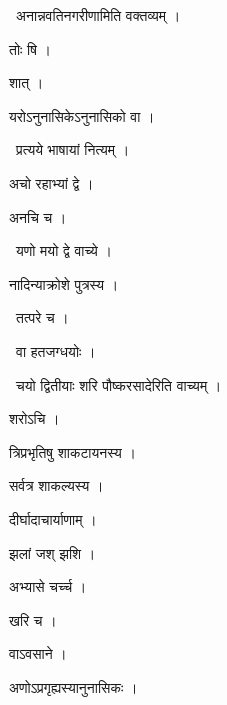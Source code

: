 \documentclass[10pt, openany, oneside]{book}
\begin{document}
\par\noindent\hspace{1.5em}{\vps वा॰}~{\qt अनान्नवतिनगरीणामिति वक्तव्यम् ।}

\noindent तोः षि ।

\noindent शात् ।

\noindent यरोऽनुनासिकेऽनुनासिको वा ।

\par\noindent\hspace{1.5em}{\vps वा॰}~{\qt प्रत्यये भाषायां नित्यम् ।}

\noindent अचो रहाभ्यां द्वे ।

\noindent अनचि च ।

\par\noindent\hspace{1.5em}{\vps वा॰}~{\qt यणो मयो द्वे वाच्ये ।}

\noindent नादिन्याक्रोशे पुत्रस्य ।

\par\noindent\hspace{1.5em}{\vps वा॰}~{\qt तत्परे च ।}

\par\noindent\hspace{1.5em}{\vps वा॰}~{\qt वा हतजग्धयोः ।}

\par\noindent\hspace{1.5em}{\vps वा॰}~{\qt चयो द्वितीयाः शरि पौष्करसादेरिति वाच्यम् ।}

\noindent शरोऽचि ।

\noindent त्रिप्रभृतिषु शाकटायनस्य ।

\noindent सर्वत्र शाकल्यस्य ।

\noindent दीर्घादाचार्याणाम् ।

\noindent झलां जश् झशि ।

\noindent अभ्यासे चर्च्च ।

\noindent खरि च ।

\noindent वाऽवसाने ।

\noindent अणोऽप्रगृह्यस्यानुनासिकः ।
\end{document}
